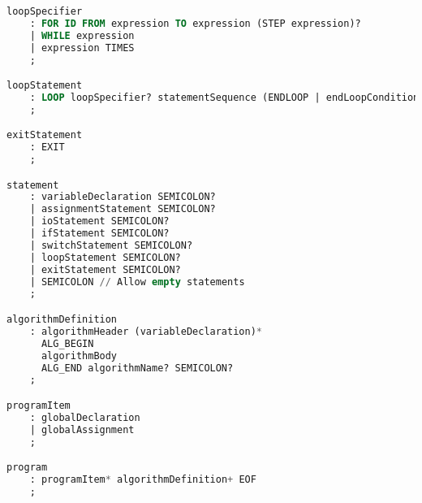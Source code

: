 \begin{lstlisting}[language=sql, caption={Парсер грамматики в формате ANTRL}, label=lst:kafka-click2]
loopSpecifier
    : FOR ID FROM expression TO expression (STEP expression)?
    | WHILE expression
    | expression TIMES
    ;

loopStatement
    : LOOP loopSpecifier? statementSequence (ENDLOOP | endLoopCondition)
    ;

exitStatement
    : EXIT
    ;

statement
    : variableDeclaration SEMICOLON?
    | assignmentStatement SEMICOLON?
    | ioStatement SEMICOLON?
    | ifStatement SEMICOLON?
    | switchStatement SEMICOLON?
    | loopStatement SEMICOLON?
    | exitStatement SEMICOLON?
    | SEMICOLON // Allow empty statements
    ;

algorithmDefinition
    : algorithmHeader (variableDeclaration)*
      ALG_BEGIN
      algorithmBody
      ALG_END algorithmName? SEMICOLON?
    ;

programItem
    : globalDeclaration
    | globalAssignment
    ;

program
    : programItem* algorithmDefinition+ EOF
    ;
\end{lstlisting}

\newpage